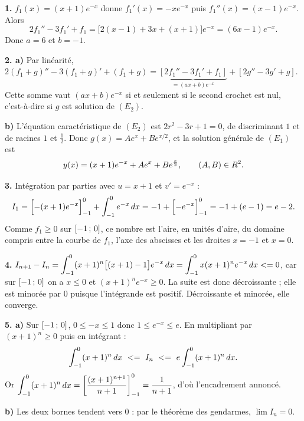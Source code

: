 \begin{corrige}
\textbf{1.} $f_{1}(x) = (x+1)e^{-x}$ donne $f_{1}'(x) = -xe^{-x}$ puis
$f_{1}''(x) = (x-1)e^{-x}$. Alors
\[
  2f_{1}''-3f_{1}'+f_{1}
  = \bigl[2(x-1)+3x+(x+1)\bigr]e^{-x} = (6x-1)e^{-x}.
\]
Donc $a = 6$ et $b = -1$.

\textbf{2. a)} Par linéarité, $2(f_{1}+g)''-3(f_{1}+g)'+(f_{1}+g)
= \underbrace{\left[2f_{1}''-3f_{1}'+f_{1}\right]}_{=(ax+b)e^{-x}}
+ \left[2g''-3g'+g\right]$. Cette somme vaut $(ax+b)e^{-x}$ si et seulement si
le second crochet est nul, c'est-à-dire si $g$ est solution de $(E_{2})$.

\textbf{b)} L'équation caractéristique de $(E_{2})$ est $2r^{2}-3r+1 = 0$, de
discriminant $1$ et de racines $1$ et $\tfrac12$. Donc
$g(x) = Ae^{x}+Be^{x/2}$, et la solution générale de $(E_{1})$ est
\[
  y(x) = (x+1)e^{-x} + Ae^{x} + Be^{\frac{x}{2}}, \qquad (A,B) \in R^{2}.
\]

\textbf{3.} Intégration par parties avec $u = x+1$ et $v' = e^{-x}$ :
\[
  I_{1} = \Bigl[-(x+1)e^{-x}\Bigr]_{-1}^{0} + \int_{-1}^{0}e^{-x}\,dx
        = -1 + \Bigl[-e^{-x}\Bigr]_{-1}^{0} = -1 + (e-1) = e-2 .
\]
Comme $f_{1} \geq 0$ sur $\left[-1\,;\,0\right]$, ce nombre est l'aire, en unités
d'aire, du domaine compris entre la courbe de $f_{1}$, l'axe des abscisses et
les droites $x=-1$ et $x=0$.

\textbf{4.} $I_{n+1}-I_{n} = \displaystyle\int_{-1}^{0}(x+1)^{n}\bigl[(x+1)-1\bigr]e^{-x}\,dx
= \int_{-1}^{0}x(x+1)^{n}e^{-x}\,dx <= 0$, car sur $\left[-1\,;\,0\right]$ on a
$x \leq 0$ et $(x+1)^{n}e^{-x} \geq 0$. La suite est donc décroissante ; elle
est minorée par $0$ puisque l'intégrande est positif. Décroissante et minorée,
elle converge.

\textbf{5. a)} Sur $\left[-1\,;\,0\right]$, $0 \leq -x \leq 1$ donc
$1 \leq e^{-x} \leq e$. En multipliant par $(x+1)^{n} \geq 0$ puis en
intégrant :
\[
  \int_{-1}^{0}(x+1)^{n}\dx \ \leq\ I_{n} \ \leq\ e\int_{-1}^{0}(x+1)^{n}\dx .
\]
Or $\displaystyle\int_{-1}^{0}(x+1)^{n}\,dx = \left[\frac{(x+1)^{n+1}}{n+1}\right]_{-1}^{0}
= \frac{1}{n+1}$, d'où l'encadrement annoncé.

\textbf{b)} Les deux bornes tendent vers $0$ : par le théorème des gendarmes,
$\lim I_{n} = 0$.
\end{corrige}

